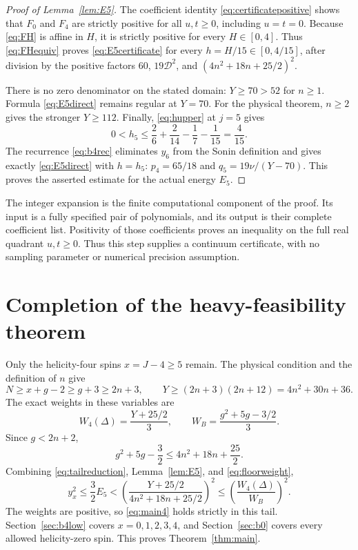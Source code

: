 \documentclass[11pt]{article}
\theoremstyle{remark}
\numberwithin{equation}{section}
\newcommand{\WB}{W_B}
\newcommand{\cD}{\mathcal D}
\begin{document}
\begin{proof}[Proof of Lemma~\ref{lem:E5}]
The coefficient identity \eqref{eq:certificatepositive} shows that $F_0$
and $F_4$ are strictly positive for all $u,t\ge0$, including $u=t=0$.
Because \eqref{eq:FH} is affine in $H$, it is strictly positive for every
$H\in[0,4]$. Thus \eqref{eq:FHequiv} proves
\eqref{eq:E5certificate} for every $h=H/15\in[0,4/15]$, after division
by the positive factors $60$, $19\cD^2$, and
$(4n^2+18n+25/2)^2$.

There is no zero denominator on the stated domain: $Y\ge70>52$ for
$n\ge1$. Formula \eqref{eq:E5direct} remains regular at $Y=70$.
For the physical theorem, $n\ge2$ gives the stronger $Y\ge112$.
Finally, \eqref{eq:hupper} at $j=5$ gives
\begin{equation}
 0<h_5\le\frac26+\frac2{14}-\frac17-\frac1{15}=\frac4{15}.
 \label{eq:h5interval}
\end{equation}
The recurrence \eqref{eq:b4rec} eliminates $y_6$ from the Sonin definition
and gives exactly \eqref{eq:E5direct} with $h=h_5$:
$p_4=65/18$ and $q_5=19\nu/(Y-70)$. This proves the asserted estimate
for the actual energy $E_5$.
\end{proof}

The integer expansion is the finite computational component of the proof.
Its input is a fully specified pair of polynomials, and its output is their
complete coefficient list. Positivity of those coefficients proves an
inequality on the full real quadrant $u,t\ge0$. Thus this step supplies a
continuum certificate, with no sampling parameter or numerical precision
assumption.

\section{Completion of the heavy-feasibility theorem}
\label{sec:completion}

Only the helicity-four spins $x=J-4\ge5$ remain. The physical condition
and the definition of $n$ give
\begin{equation}
 N\ge x+g-2\ge g+3\ge2n+3,
 \qquad Y\ge(2n+3)(2n+12)=4n^2+30n+36.
 \label{eq:E5physical}
\end{equation}
The exact weights in these variables are
\begin{equation}
 W_4(\Delta)=\frac{Y+25/2}{3},\qquad
 \WB=\frac{g^2+5g-3/2}{3}.
 \label{eq:b4weights}
\end{equation}
Since $g<2n+2$,
\begin{equation}
 g^2+5g-\frac32\le4n^2+18n+\frac{25}{2}.
 \label{eq:floorweight}
\end{equation}
Combining \eqref{eq:tailreduction}, Lemma~\ref{lem:E5}, and
\eqref{eq:floorweight},
\begin{equation}
 y_x^2\le\frac32E_5
 <\left(\frac{Y+25/2}{4n^2+18n+25/2}\right)^2
 \le\left(\frac{W_4(\Delta)}{\WB}\right)^2.
 \label{eq:fulltailbound}
\end{equation}
The weights are positive, so \eqref{eq:main4} holds strictly in this tail.
Section~\ref{sec:b4low} covers $x=0,1,2,3,4$, and
Section~\ref{sec:b0} covers every allowed helicity-zero spin. This proves
Theorem~\ref{thm:main}.
\end{document}
